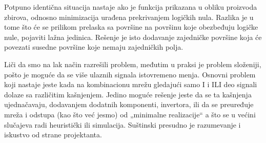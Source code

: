 \begin{frame}[label=02-s054]
\gusttekst
Potpuno identična situacija nastaje ako je funkcija prikazana u obliku proizvoda zbirova, odnosno minimizacija urađena prekrivanjem logičkih nula. Razlika je u tome što će se prilikom prelaska sa površine na površinu koje obezbeđuju logičke nule, pojaviti lažna jedinica. Rešenje je isto dodavanje zajedničke površine koja će povezati susedne površine koje nemaju zajedničkih polja.

Liči da smo na lak način razrešili problem, međutim u praksi je problem složeniji, pošto je moguće da se više ulaznih signala istovremeno menja. Osnovni problem koji nastaje jeste kada na kombinacionu mrežu gledajući samo I i ILI deo signali dolaze sa različitim kašnjenjem. Jedino moguće rešenje jeste da se ta kašnjenja ujednačavaju, dodavanjem dodatnih komponenti, invertora, ili da se preuređuje mreža i odstupa (kao što već jesmo) od „minimalne realizacije“ a što se u većini slučajeva radi heuristički ili simulacija. Suštinski presudno je razumevanje i iskustvo od strane projektanta.
\end{frame}
